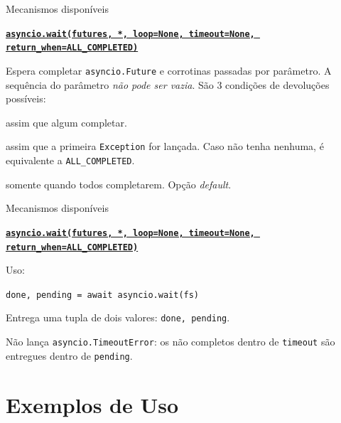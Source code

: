 \documentclass[12pt]{beamer}
\begin{document}
\begin{frame}[fragile]{Mecanismos disponíveis}
  \small{
  \textbf{\texttt{\href{https://docs.python.org/3/library/asyncio-task.html\#asyncio.wait}{asyncio.wait(futures, *, loop=None, timeout=None, return\_when=ALL\_COMPLETED)}}}

  Espera completar \texttt{asyncio.Future} e corrotinas passadas por parâmetro. A sequência do parâmetro \emph{não pode ser vazia}. São 3 condições de devoluções possíveis:

  \begin{description}\footnotesize{
    \item[\texttt{FIST\_COMPLETED}] assim que algum completar. 
    \item[\texttt{FIST\_EXCEPTION}] assim que a primeira \texttt{Exception} for lançada. Caso não tenha nenhuma, é equivalente a \texttt{ALL\_COMPLETED}. 
    \item[\texttt{ALL\_COMPLETED}] somente quando todos completarem. Opção \textit{default}.
  }\end{description}
  }
\end{frame}

\begin{frame}[fragile]{Mecanismos disponíveis}
  \small{
  \textbf{\texttt{\href{https://docs.python.org/3/library/asyncio-task.html\#asyncio.wait}{asyncio.wait(futures, *, loop=None, timeout=None, return\_when=ALL\_COMPLETED)}}}

  Uso:

  \verb+done, pending = await asyncio.wait(fs)+

  Entrega uma tupla de dois valores: \texttt{done, pending}.

  Não lança \texttt{asyncio.TimeoutError}: os não completos dentro de \texttt{timeout} são entregues dentro de \texttt{pending}.
  }
\end{frame}



\section{Exemplos de Uso}
\end{document}
